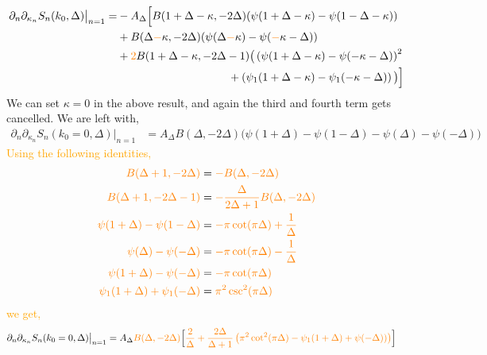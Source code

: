 \documentclass[11pt]{article}
\newcommand{\p}{\partial}
\newcommand{\nn}{\nonumber}
\newcommand{\lb}{\left(}
\newcommand{\rb}{\right)}
\newcommand{\JM}[1]{\textcolor{orange}{#1}}
\begin{document}
\begin{align*}
    \p_n \p_{\kappa_n}S_n(k_0,\Delta)\big|_{n=1} =& -A_{\Delta}\Big[ B(1+ \Delta - \kappa, -2\Delta)(\psi(1+ \Delta - \kappa) - \psi(1-\Delta - \kappa)) \nn \\
    &+ B(\Delta \JM{-} \kappa, - 2\Delta)(\psi(\Delta \JM{-} \kappa) - \psi(\JM{-}\kappa - \Delta))  \nn \\
    &+\JM{2}B(1+ \Delta - \kappa, -2\Delta - 1)\big( \lb \psi(1+\Delta - \kappa) - \psi(-\kappa-\Delta)\rb^2 \nn \\
    & \qquad \qquad \qquad \qquad \qquad +\lb \psi_1(1+\Delta - \kappa) - \psi_1(-\kappa - \Delta)\rb \big)\Big]\nn \\
\end{align*}
We can set $\kappa = 0 $ in the above result, and again the third and fourth term gets cancelled. We are left with,
\begin{align}
    \p_n \p_{\kappa_n}S_n(k_0 = 0,\Delta)\big|_{n=1} &= A_\Delta B(\Delta , -2\Delta)\big( \psi(1+\Delta) - \psi(1-\Delta)  - \psi(\Delta ) - \psi(-\Delta)\big) 
\end{align}
\JM{Using the following identities,}
\begin{align*}
    \JM{B(\Delta +1, -2\Delta)} &= \JM{-B(\Delta, -2\Delta)} \nn\\
    \JM{ B(\Delta + 1, -2\Delta -1)} &= \JM{-\frac{\Delta}{2\Delta +1} B(\Delta,-2\Delta)} \nn\\
    \JM{\psi(1+\Delta) - \psi(1-\Delta)} &= \JM{-\pi \cot(\pi \Delta)  + \frac{1}{\Delta}} \nn \\
    \JM{\psi(\Delta) - \psi(-\Delta)} &= \JM{-\pi \cot(\pi \Delta) -\frac{1}{\Delta}} \nn \\
    \JM{\psi(1+\Delta) - \psi(-\Delta)} &= \JM{-\pi \cot(\pi \Delta)}\nn \\
    \JM{\psi_1(1+\Delta) + \psi_1(-\Delta) } &= \JM{\pi^2 \csc ^2(\pi\Delta)}
\end{align*}
\JM{we get,}
\begin{align*}
    \p_n \p_{\kappa_n}S_n(k_0 = 0,\Delta)\big|_{n=1} &= A_\Delta \JM{B(\Delta , -2\Delta)}\Big[ \JM{\frac{2}{\Delta} + \frac{2\Delta}{\Delta + 1}\lb \pi^2 \cot^2(\pi \Delta)  - \psi_1(1+\Delta) + \psi(-\Delta))\rb}\Big]
\end{align*}
\end{document}
